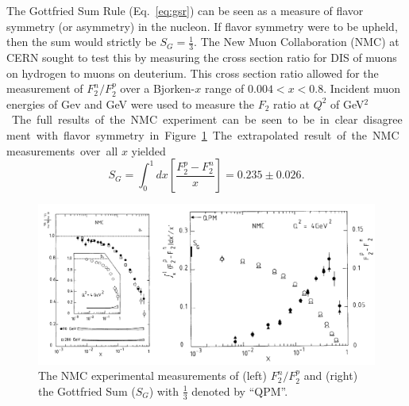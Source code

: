 
The Gottfried Sum Rule (Eq.~\ref{eq:gsr}) can be seen as a measure of flavor symmetry (or asymmetry) in the nucleon. If flavor symmetry were to be upheld, then the sum would strictly be $S_G = \frac{1}{3}$. The New Muon Collaboration (NMC) at CERN sought to test this by measuring the cross section ratio for DIS of muons on hydrogen to muons on deuterium\cite{Amaudruz:1991nw,Arneodo:1994sh}. This cross section ratio allowed for the measurement of $F_2^n/F_2^p$ over a Bjorken-$x$ range of $0.004 < x < 0.8$.  Incident muon energies of \unit[90]{Gev} and \unit[280]{GeV} were used to measure the $F_2$ ratio at $Q^2$ of \unit[4]{GeV$^2$}. The full results of the NMC experiment can be seen to be in clear disagreement with flavor symmetry in Figure~\ref{fig:nmc}. The extrapolated result of the NMC measurements over all $x$ yielded
\begin{equation}
S_G = \int_0^1 dx \left[ \frac{F_2^p - F_2^n}{x} \right] = 0.235 \pm 0.026.
\end{equation}

\begin{figure}[h]
	\centering
	\includegraphics[width=\textwidth]{figures/background/NMC-All.pdf}
	\caption{The NMC experimental measurements of (left) $F_2^n/F_2^p$ and (right) the Gottfried Sum ($S_G$) with $\frac{1}{3}$ denoted by ``QPM''.}
	\label{fig:nmc}
\end{figure}

